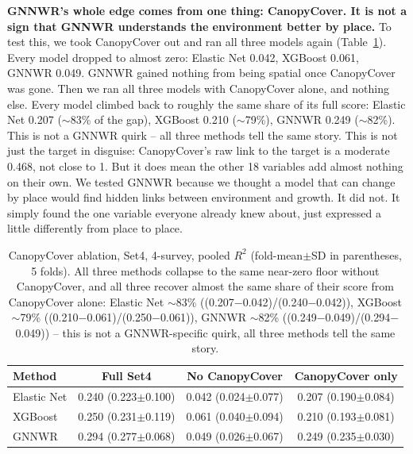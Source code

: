 \textbf{GNNWR's whole edge comes from one thing: CanopyCover. It is not a sign that GNNWR understands the environment better by place.} To test this, we took CanopyCover out and ran all three models again (Table~\ref{tab:results-q2-ablation}). Every model dropped to almost zero: Elastic Net 0.042, XGBoost 0.061, GNNWR 0.049. GNNWR gained nothing from being spatial once CanopyCover was gone. Then we ran all three models with CanopyCover alone, and nothing else. Every model climbed back to roughly the same share of its full score: Elastic Net 0.207 ($\sim$83\% of the gap), XGBoost 0.210 ($\sim$79\%), GNNWR 0.249 ($\sim$82\%). This is not a GNNWR quirk -- all three methods tell the same story. This is not just the target in disguise: CanopyCover's raw link to the target is a moderate 0.468, not close to 1. But it does mean the other 18 variables add almost nothing on their own. We tested GNNWR because we thought a model that can change by place would find hidden links between environment and growth. It did not. It simply found the one variable everyone already knew about, just expressed a little differently from place to place.

\begin{table}[!htbp]
\centering
\scriptsize
\renewcommand{\arraystretch}{1.2}
\begin{tabular}{lccc}
\toprule
Method & Full Set4 & No CanopyCover & CanopyCover only \\
\midrule
Elastic Net & 0.240 (0.223$\pm$0.100) & 0.042 (0.024$\pm$0.077) & 0.207 (0.190$\pm$0.084) \\
XGBoost & 0.250 (0.231$\pm$0.119) & 0.061 (0.040$\pm$0.094) & 0.210 (0.193$\pm$0.081) \\
GNNWR & 0.294 (0.277$\pm$0.068) & 0.049 (0.026$\pm$0.067) & 0.249 (0.235$\pm$0.030) \\
\bottomrule
\end{tabular}
\caption{\small{CanopyCover ablation, Set4, 4-survey, pooled $R^2$ (fold-mean$\pm$SD in
parentheses, 5 folds). All three methods collapse to the same near-zero floor without
CanopyCover, and all three recover almost the same share of their score from CanopyCover
alone: Elastic Net $\sim$83\% ((0.207$-$0.042)/(0.240$-$0.042)), XGBoost $\sim$79\%
((0.210$-$0.061)/(0.250$-$0.061)), GNNWR $\sim$82\% ((0.249$-$0.049)/(0.294$-$0.049)) -- this
is not a GNNWR-specific quirk, all three methods tell the same story.}}
\label{tab:results-q2-ablation}
\end{table}

